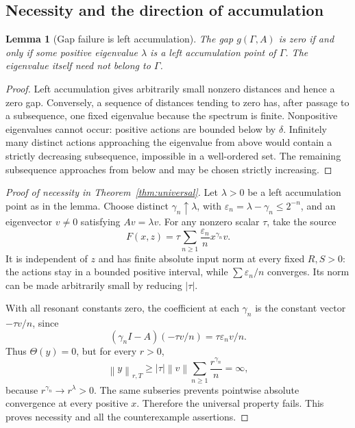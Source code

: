 \documentclass[11pt,a4paper]{article}
\numberwithin{equation}{section}
\newtheorem{lemma}[theorem]{Lemma}
\theoremstyle{definition}
\theoremstyle{remark}
\newcommand{\G}{\Gamma}
\newcommand{\norm}[1]{\left\lVert #1\right\rVert}
\begin{document}
\subsection{Necessity and the direction of accumulation}
\begin{lemma}[Gap failure is left accumulation]\label{lem:gap-failure}
The gap \(g(\G,A)\) is zero if and only if some positive eigenvalue
\(\lambda\) is a left accumulation point of \(\G\).
The eigenvalue itself need not belong to \(\G\).
\end{lemma}
\begin{proof}
Left accumulation gives arbitrarily small nonzero distances and hence
a zero gap. Conversely, a sequence of distances tending to zero has,
after passage to a subsequence, one fixed eigenvalue because the
spectrum is finite. Nonpositive eigenvalues cannot occur: positive
actions are bounded below by \(\delta\). Infinitely many distinct
actions approaching the eigenvalue from above would contain a
strictly decreasing subsequence, impossible in a well-ordered set.
The remaining subsequence approaches from below and may be chosen
strictly increasing.
\end{proof}

\begin{proof}[Proof of necessity in Theorem~\ref{thm:universal}]
Let \(\lambda>0\) be a left accumulation point as in the lemma.
Choose distinct \(\gamma_n\uparrow\lambda\), with
\(\varepsilon_n=\lambda-\gamma_n\le2^{-n}\), and an eigenvector
\(v\ne0\) satisfying \(Av=\lambda v\). For any nonzero scalar
\(\tau\), take the source
\begin{equation}\label{eq:gap-counterexample}
 F(x,z)=\tau\sum_{n\ge1}\frac{\varepsilon_n}{n}
                       x^{\gamma_n}v.
\end{equation}
It is independent of \(z\) and has finite absolute input norm at
every fixed \(R,S>0\): the actions stay in a bounded positive
interval, while \(\sum\varepsilon_n/n\) converges. Its norm can be
made arbitrarily small by reducing \(|\tau|\).

With all resonant constants zero, the coefficient at each
\(\gamma_n\) is the constant vector \(-\tau v/n\), since
\[
 (\gamma_n I-A)(-\tau v/n)
       =\tau\varepsilon_n v/n.
\]
Thus \(\Theta(y)=0\), but for every \(r>0\),
\[
 \norm{y}_{r,T}
 \ge |\tau|\norm v\sum_{n\ge1}\frac{r^{\gamma_n}}n=\infty,
\]
because \(r^{\gamma_n}\to r^\lambda>0\). The same subseries
prevents pointwise absolute convergence at every positive \(x\).
Therefore the universal property fails. This proves necessity and
all the counterexample assertions.
\end{proof}
\end{document}
